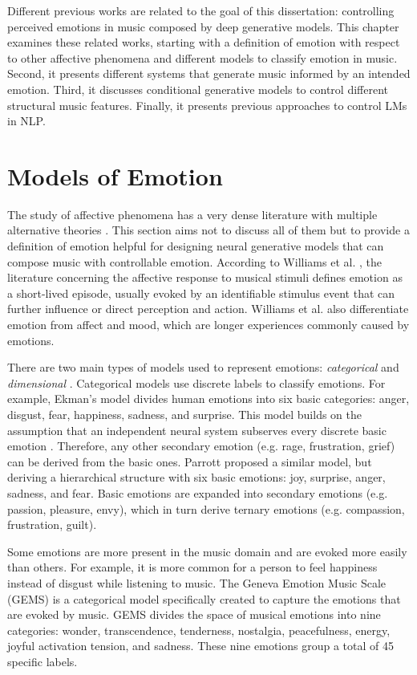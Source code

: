 Different previous works are related to the goal of this dissertation: controlling perceived emotions in music composed by deep generative models. This chapter examines these related works, starting with a definition of emotion with respect to other affective phenomena and different models to classify emotion in music. Second, it presents different systems that generate music informed by an intended emotion. Third, it discusses conditional generative models to control different structural music features. Finally, it presents previous approaches to control LMs in NLP.

\section{Models of Emotion}

The study of affective phenomena has a very dense literature with multiple alternative theories \cite{ekkekakis2013measurement}. This section aims not to discuss all of them but to provide a definition of emotion helpful for designing neural generative models that can compose music with controllable emotion.  According to Williams et al. \cite{williams2015investigating}, the literature concerning the affective response to musical stimuli defines emotion as a short-lived episode, usually evoked by an identifiable stimulus event that can further influence or direct perception and action. Williams et al. \cite{williams2015investigating} also differentiate emotion from affect and mood, which are longer experiences commonly caused by emotions.

There are two main types of models used to represent emotions: \emph{categorical} and \emph{dimensional} \cite{eerola2011comparison}. Categorical models use discrete labels to classify emotions. For example, Ekman's model \cite{ekman1992argument} divides human emotions into six basic categories: anger, disgust, fear, happiness, sadness, and surprise. This model builds on the assumption that an independent neural system subserves every discrete basic emotion \cite{eerola2011comparison}. Therefore, any other secondary emotion (e.g. rage, frustration, grief) can be derived from the basic ones. Parrott \cite{parrott2001emotions} proposed a similar model, but deriving a hierarchical structure with six basic emotions: joy, surprise, anger, sadness, and fear. Basic emotions are expanded into secondary emotions (e.g. passion, pleasure, envy), which in turn derive ternary emotions (e.g. compassion, frustration, guilt).

Some emotions are more present in the music domain and are evoked more easily than others. For example, it is more common for a person to feel happiness instead of disgust while listening to music. The Geneva Emotion Music Scale (GEMS) \cite{zentner2008emotions} is a categorical model specifically created to capture the emotions that are evoked by music. GEMS divides the space of musical emotions into nine categories: wonder, transcendence, tenderness, nostalgia, peacefulness, energy, joyful activation tension, and sadness. These nine emotions group a total of 45 specific labels.

